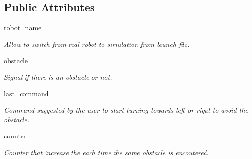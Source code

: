 \subsection*{Public Attributes}
\begin{DoxyCompactItemize}
\item 
\mbox{\label{classoab__miro_1_1ObstacleAvoidance_ab6cfa8eebb476816919dfa2c95293309}} 
\mbox{\hyperlink{classoab__miro_1_1ObstacleAvoidance_ab6cfa8eebb476816919dfa2c95293309}{robot\+\_\+name}}
\begin{DoxyCompactList}\small\item\em Allow to switch from real robot to simulation from launch file. \end{DoxyCompactList}\item 
\mbox{\label{classoab__miro_1_1ObstacleAvoidance_a573396c9c743224c844822721bf163e1}} 
\mbox{\hyperlink{classoab__miro_1_1ObstacleAvoidance_a573396c9c743224c844822721bf163e1}{obstacle}}
\begin{DoxyCompactList}\small\item\em Signal if there is an obstacle or not. \end{DoxyCompactList}\item 
\mbox{\label{classoab__miro_1_1ObstacleAvoidance_a918f768d96299a5f9e9c0f6425331755}} 
\mbox{\hyperlink{classoab__miro_1_1ObstacleAvoidance_a918f768d96299a5f9e9c0f6425331755}{last\+\_\+command}}
\begin{DoxyCompactList}\small\item\em Command suggested by the user to start turning towards left or right to avoid the obstacle. \end{DoxyCompactList}\item 
\mbox{\label{classoab__miro_1_1ObstacleAvoidance_a7983164a376933bfb9462c66481e8d23}} 
\mbox{\hyperlink{classoab__miro_1_1ObstacleAvoidance_a7983164a376933bfb9462c66481e8d23}{counter}}
\begin{DoxyCompactList}\small\item\em Counter that increase the each time the same obstacle is encoutered. \end{DoxyCompactList}\item 
\mbox{\label{classoab__miro_1_1ObstacleAvoidance_a9241219fb6f3e9f4e4a1117660c2833d}} 

\end{DoxyCompactItemize}
